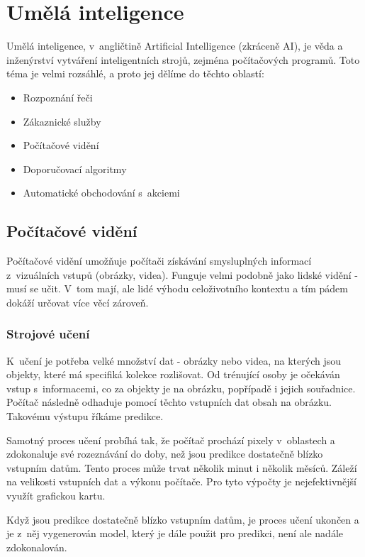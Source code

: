 \section{Umělá inteligence}
Umělá inteligence, v~angličtině Artificial Intelligence (zkráceně AI), je věda a inženýrství vytváření inteligentních strojů, zejména počítačových programů.\cite{What-is-AI} Toto téma je velmi rozsáhlé, a proto jej dělíme do těchto oblastí\cite{IBM-AI}:
\begin{itemize}
	\item Rozpoznání řeči
	\item Zákaznické služby
	\item Počítačové vidění
	\item Doporučovací algoritmy
	\item Automatické obchodování s~akciemi
\end{itemize}

\subsection{Počítačové vidění}
Počítačové vidění umožňuje počítači získávání smysluplných informací z~vizuálních vstupů (obrázky, videa). Funguje velmi podobně jako lidské vidění - musí se učit. V~tom mají, ale lidé výhodu celoživotního kontextu a tím pádem dokáží určovat více věcí zároveň. \cite{IBM-CV}\par

\subsubsection{Strojové učení}
K~učení je potřeba velké množství dat - obrázky nebo videa, na kterých jsou objekty, které má specifiká kolekce rozlišovat. Od trénující osoby je očekáván vstup s~informacemi, co za objekty je na obrázku, popřípadě i jejich souřadnice. Počítač následně odhaduje pomocí těchto vstupních dat obsah na obrázku. Takovému výstupu říkáme predikce.\par
Samotný proces učení probíhá tak, že počítač prochází pixely v~oblastech a zdokonaluje své rozeznávání do doby, než jsou predikce dostatečně blízko vstupním datům. Tento proces může trvat několik minut i několik měsíců. Záleží na velikosti vstupních dat a výkonu počítače. Pro tyto výpočty je nejefektivnější využít grafickou kartu.\par
Když jsou predikce dostatečně blízko vstupním datům, je proces učení ukončen a je z~něj vygenerován model, který je dále použit pro predikci, není ale nadále zdokonalován. 

